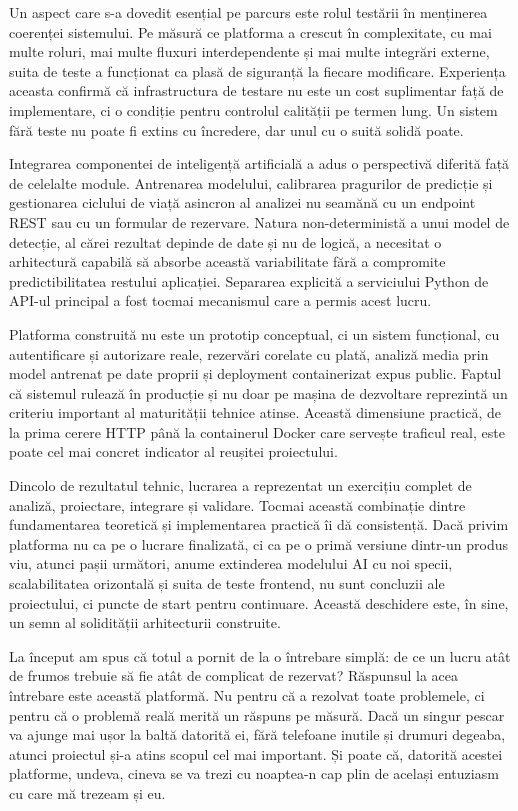 Un aspect care s-a dovedit esențial pe parcurs este rolul testării în menținerea coerenței sistemului. Pe măsură ce platforma a crescut în complexitate, cu mai multe roluri, mai multe fluxuri interdependente și mai multe integrări externe, suita de teste a funcționat ca plasă de siguranță la fiecare modificare. Experiența aceasta confirmă că infrastructura de testare nu este un cost suplimentar față de implementare, ci o condiție pentru controlul calității pe termen lung. Un sistem fără teste nu poate fi extins cu încredere, dar unul cu o suită solidă poate.

Integrarea componentei de inteligență artificială a adus o perspectivă diferită față de celelalte module. Antrenarea modelului, calibrarea pragurilor de predicție și gestionarea ciclului de viață asincron al analizei nu seamănă cu un endpoint REST sau cu un formular de rezervare. Natura non-deterministă a unui model de detecție, al cărei rezultat depinde de date și nu de logică, a necesitat o arhitectură capabilă să absorbe această variabilitate fără a compromite predictibilitatea restului aplicației. Separarea explicită a serviciului Python de API-ul principal a fost tocmai mecanismul care a permis acest lucru.

Platforma construită nu este un prototip conceptual, ci un sistem funcțional, cu autentificare și autorizare reale, rezervări corelate cu plată, analiză media prin model antrenat pe date proprii și deployment containerizat expus public. Faptul că sistemul rulează în producție și nu doar pe mașina de dezvoltare reprezintă un criteriu important al maturității tehnice atinse. Această dimensiune practică, de la prima cerere HTTP până la containerul Docker care servește traficul real, este poate cel mai concret indicator al reușitei proiectului.

Dincolo de rezultatul tehnic, lucrarea a reprezentat un exercițiu complet de analiză, proiectare, integrare și validare. Tocmai această combinație dintre fundamentarea teoretică și implementarea practică îi dă consistență. Dacă privim platforma nu ca pe o lucrare finalizată, ci ca pe o primă versiune dintr-un produs viu, atunci pașii următori, anume extinderea modelului AI cu noi specii, scalabilitatea orizontală și suita de teste frontend, nu sunt concluzii ale proiectului, ci puncte de start pentru continuare. Această deschidere este, în sine, un semn al solidității arhitecturii construite.

La început am spus că totul a pornit de la o întrebare simplă: de ce un lucru atât de frumos trebuie să fie atât de complicat de rezervat? Răspunsul la acea întrebare este această platformă. Nu pentru că a rezolvat toate problemele, ci pentru că o problemă reală merită un răspuns pe măsură. Dacă un singur pescar va ajunge mai ușor la baltă datorită ei, fără telefoane inutile și drumuri degeaba, atunci proiectul și-a atins scopul cel mai important. Și poate că, datorită acestei platforme, undeva, cineva se va trezi cu noaptea-n cap plin de același entuziasm cu care mă trezeam și eu.
